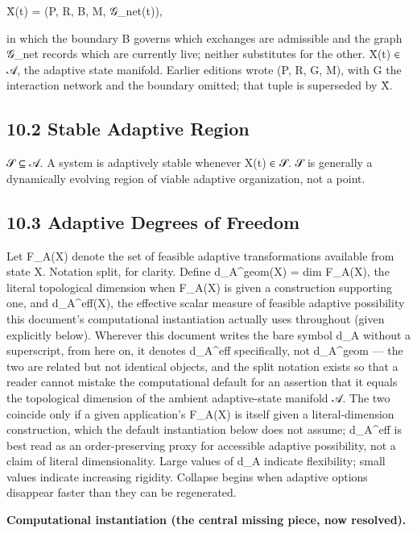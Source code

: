 \documentclass[
]{article}
\begin{document}
X̄(t) = (P, R, B, M, 𝒢\_net(t)),

in which the boundary B governs which exchanges are admissible and the
graph 𝒢\_net records which are currently live; neither substitutes for
the other. X̄(t) ∈ 𝒜, the adaptive state manifold. Earlier editions wrote
(P, R, G, M), with G the interaction network and the boundary omitted;
that tuple is superseded by X̄.

\hypertarget{stable-adaptive-region}{%
\subsection{10.2 Stable Adaptive Region}\label{stable-adaptive-region}}

𝒮 ⊆ 𝒜. A system is adaptively stable whenever X(t) ∈ 𝒮. 𝒮 is generally a
dynamically evolving region of viable adaptive organization, not a
point.

\hypertarget{adaptive-degrees-of-freedom}{%
\subsection{10.3 Adaptive Degrees of
Freedom}\label{adaptive-degrees-of-freedom}}

Let F\_A(X) denote the set of feasible adaptive transformations
available from state X. Notation split, for clarity. Define
d\_A\^{}geom(X) = dim F\_A(X), the literal topological dimension when
F\_A(X) is given a construction supporting one, and d\_A\^{}eff(X), the
effective scalar measure of feasible adaptive possibility this
document's computational instantiation actually uses throughout (given
explicitly below). Wherever this document writes the bare symbol d\_A
without a superscript, from here on, it denotes d\_A\^{}eff
specifically, not d\_A\^{}geom --- the two are related but not identical
objects, and the split notation exists so that a reader cannot mistake
the computational default for an assertion that it equals the
topological dimension of the ambient adaptive-state manifold 𝒜. The two
coincide only if a given application's F\_A(X) is itself given a
literal-dimension construction, which the default instantiation below
does not assume; d\_A\^{}eff is best read as an order-preserving proxy
for accessible adaptive possibility, not a claim of literal
dimensionality. Large values of d\_A indicate flexibility; small values
indicate increasing rigidity. Collapse begins when adaptive options
disappear faster than they can be regenerated.

\textbf{Computational instantiation (the central missing piece, now
resolved).}
\end{document}
